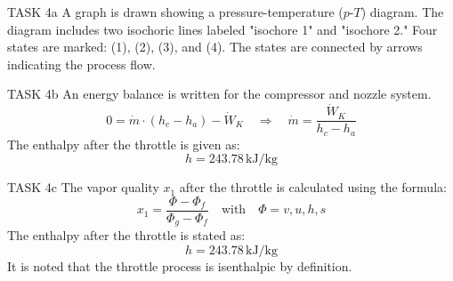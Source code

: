 TASK 4a  
A graph is drawn showing a pressure-temperature (\(p\)-\(T\)) diagram. The diagram includes two isochoric lines labeled "isochore 1" and "isochore 2." Four states are marked: (1), (2), (3), and (4). The states are connected by arrows indicating the process flow.  

TASK 4b  
An energy balance is written for the compressor and nozzle system.  
\[
0 = \dot{m} \cdot (h_c - h_a) - \dot{W}_K \quad \Rightarrow \quad \dot{m} = \frac{\dot{W}_K}{h_c - h_a}
\]  
The enthalpy after the throttle is given as:  
\[
h = 243.78 \, \text{kJ/kg}
\]  

TASK 4c  
The vapor quality \(x_1\) after the throttle is calculated using the formula:  
\[
x_1 = \frac{\Phi - \Phi_f}{\Phi_g - \Phi_f} \quad \text{with} \quad \Phi = v, u, h, s
\]  
The enthalpy after the throttle is stated as:  
\[
h = 243.78 \, \text{kJ/kg}
\]  
It is noted that the throttle process is isenthalpic by definition.